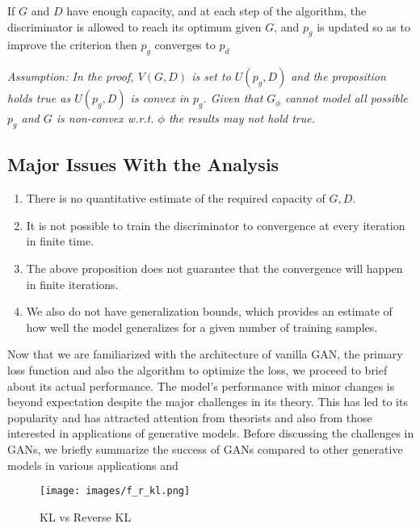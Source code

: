 \begin{tcolorbox}[colback=gray!03!white,colframe=black!75!black]
\begin{prop} \citep{ganGoodfellow}
\label{prop:conv}
If $G$ and $D$ have enough capacity, and at each step of the algorithm, the discriminator is allowed to reach its optimum given $G$, and $p_g$ is updated so as to improve the criterion then $p_g$ converges to $p_d$
\end{prop}{}
\emph{Assumption: In the proof, $V(G, D)$ is set to $U(p_g, D)$ and the proposition holds true as $U(p_g,D)$ is convex in $p_g$. Given that $G_{\phi}$ cannot model all possible $p_g$ and $G$ is non-convex w.r.t. $\phi$ the results may not hold true. }
\end{tcolorbox}

\subsection*{Major Issues With the Analysis}
\begin{enumerate}
    \item There is no quantitative estimate of the required capacity of $G, D$.
    \item It is not possible to train the discriminator to convergence at every iteration in finite time. 
    \item The above proposition does not guarantee that the convergence will happen in finite iterations.
    \item We also do not have generalization bounds, which provides an estimate of how well the model generalizes for a given number of training samples.
\end{enumerate}

\vspace{\baselineskip} 
Now that we are familiarized with the architecture of vanilla GAN, the primary loss function and also the algorithm to optimize the loss, we proceed to brief about its actual performance. The model's performance with minor changes is beyond expectation despite the major challenges in its theory. This has led to its popularity and has attracted attention from theorists and also from those interested in applications of generative models. Before discussing the challenges in GANs, we briefly summarize the success of GANs compared to other generative models in various applications and 

\begin{figure}
    \centering
    \texttt{[image: images/f\_r\_kl.png]}
    \caption{KL vs Reverse KL}
    \label{fig:frkl}
\end{figure}{}

